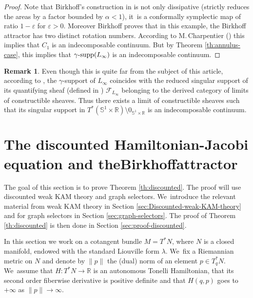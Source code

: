 \documentclass[10pt]{amsart}
\theoremstyle{definition}
\newtheorem{rem}[thm]{Remark}
\newcommand{\F}{{\mathcal F}}
\newcommand{\R}{\mathbb{R}}
\DeclareMathOperator{\gammasupp}{\gamma\textup{-supp}}
\begin{document}
\begin{proof} Note that Birkhoff's construction in \cite[\S7]{Birkhoff-attractor} is not only dissipative (\ie strictly reduces the areas by a factor bounded by $\alpha <1$), it~is a conformally symplectic map of ratio $1- \varepsilon $ for $ \varepsilon >0$. Moreover Birkhoff proves that in this example, the Birkhoff attractor has two distinct rotation numbers. According to M.\,Charpentier (\cite{Charpentier-1}) this implies that $C_{1}$ is an indecomposable continuum.
But by Theorem \ref{th:annulus-case}, this implies that $\gammasupp(L_{\infty})$ is an indecomposable continuum.
\end{proof}
\begin{rem}
Even though this is quite far from the subject of this article, according to \cite{AGHIV}, the $\gamma$\nobreakdash-support of $L_{\infty}$ coincides with the reduced singular support of its quantifying sheaf (defined in \cite{Guillermou-Viterbo}) $\F_{L_{\infty}}$ belonging to the derived category of limits of constructible sheaves. Thus there exists a limit of constructible sheaves such that its singular support in $T^{*}({\mathbb S}^{1}\times {\mathbb R})\setminus 0_{{\mathbb S}^{1}\times {\mathbb R}}$ is an indecomposable continuum.
\end{rem}

\section{The discounted Hamiltonian-Jacobi equation and the\nobreakspace Birkhoff\nobreakspace attractor}\label{sec:HJ}

The goal of this section is to prove Theorem \ref{th:discounted}. The proof will use discounted weak KAM theory and graph selectors. We~introduce the relevant material from weak KAM theory in Section \ref{sec:Discounted-weak-KAM-theory} and for graph selectors in Section \ref{sec:graph-selectors}. The proof of Theorem \ref{th:discounted} is then done in Section \ref{sec:proof-discounted}.

In this section we work on a cotangent bundle $M=T^*N$, where $N$ is a closed manifold, endowed with the standard Liouville form $\lambda$. We~fix a Riemannian metric on $N$ and denote by $\| p\|$ the (dual) norm of an element $p\in T^*_qN$. We~assume that $H:T^*N\to \R$ is an autonomous Tonelli Hamiltonian, \ie that its second order fiberwise derivative
is positive definite and that $H(q,p)$ goes to $+\infty$ as $\|p\|\to\infty$.
\end{document}
